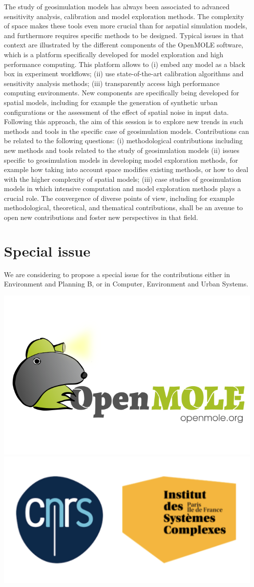 \documentclass[11pt]{article}
\begin{document}
The study of geosimulation models has always been associated to advanced sensitivity analysis, calibration and model exploration methods. The complexity of space makes these tools even more crucial than for aspatial simulation models, and furthermore requires specific methods to be designed. Typical issues in that context are illustrated by the different components of the OpenMOLE software, which is a platform specifically developed for model exploration and high performance computing. This platform allows to (i) embed any model as a black box in experiment workflows; (ii) use state-of-the-art calibration algorithms and sensitivity analysis methods; (iii) transparently access high performance computing environments. New components are specifically being developed for spatial models, including for example the generation of synthetic urban configurations or the assessment of the effect of spatial noise in input data. Following this approach, the aim of this session is to explore new trends in such methods and tools in the specific case of geosimulation models. Contributions can be related to the following questions: (i) methodological contributions including new methods and tools related to the study of geosimulation models (ii) issues specific to geosimulation models in developing model exploration methods, for example how taking into account space modifies existing methods, or how to deal with the higher complexity of spatial models; (iii) case studies of geosimulation models in which intensive computation and model exploration methods plays a crucial role. The convergence of diverse points of view, including for example methodological, theoretical, and thematical contributions, shall be an avenue to open new contributions and foster new perspectives in that field.


\section*{Special issue}

We are considering to propose a special issue for the contributions either in Environment and Planning B, or in Computer, Environment and Urban Systems.



\centering
\includegraphics[width=0.3\linewidth]{openmole}\hspace{0.5cm}
\includegraphics[width=0.3\linewidth]{isc}
\end{document}
